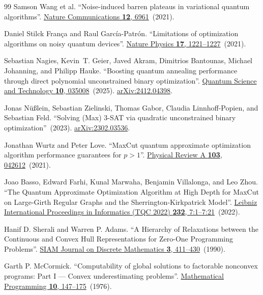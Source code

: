 \documentclass[a4paper,onecolumn,11pt,unpublished]{quantumarticle}
\theoremstyle{remark}
\begin{document}
\begin{thebibliography}{99}
Samson Wang et al.
\newblock ``Noise-induced barren plateaus in variational quantum algorithms''.
\newblock \href{https://doi.org/10.1038/s41467-021-27045-6}{Nature Communications {\bf 12}, 6961}~(2021).


Daniel Stilck França and Raul García-Patrón.
\newblock ``Limitations of optimization algorithms on noisy quantum devices''.
\newblock \href{https://doi.org/10.1038/s41567-021-01356-3}{Nature Physics {\bf 17}, 1221--1227}~(2021).


Sebastian Nagies, Kevin~T. Geier, Javed Akram, Dimitrios Bantounas, Michael Johanning, and Philipp Hauke.
\newblock ``Boosting quantum annealing performance through direct polynomial unconstrained binary optimization''.
\newblock \href{https://dx.doi.org/10.1088/2058-9565/adcae6}{Quantum Science and Technology {\bf 10}, 035008}~(2025).
\newblock \href{http://arxiv.org/abs/2412.04398}{arXiv:2412.04398}.

Jonas N{\"u}{\ss}lein, Sebastian Zielinski, Thomas Gabor, Claudia Linnhoff-Popien, and Sebastian Feld.
\newblock ``Solving (Max) 3-SAT via quadratic unconstrained binary optimization''~(2023).
\newblock \href{http://arxiv.org/abs/2302.03536}{arXiv:2302.03536}.

Jonathan Wurtz and Peter Love.
\newblock ``MaxCut quantum approximate optimization algorithm performance guarantees for $p>1$''.
\newblock \href{https://doi.org/10.1103/physreva.103.042612}{Physical Review A {\bf 103}, 042612}~(2021).


Joao Basso, Edward Farhi, Kunal Marwaha, Benjamin Villalonga, and Leo Zhou.
\newblock ``The Quantum Approximate Optimization Algorithm at High Depth for MaxCut on Large-Girth Regular Graphs and the Sherrington-Kirkpatrick Model''.
\newblock \href{https://doi.org/10.4230/lipics.tqc.2022.7}{Leibniz International Proceedings in Informatics (TQC 2022) {\bf 232}, 7:1--7:21}~(2022).


Hanif D. Sherali and Warren P. Adams.
\newblock ``A Hierarchy of Relaxations between the Continuous and Convex Hull Representations for Zero-One Programming Problems''.
\newblock \href{https://doi.org/10.1137/0403036}{SIAM Journal on Discrete Mathematics {\bf 3}, 411--430}~(1990).


Garth P. McCormick.
\newblock ``Computability of global solutions to factorable nonconvex programs: Part I --- Convex underestimating problems''.
\newblock \href{https://doi.org/10.1007/bf01580665}{Mathematical Programming {\bf 10}, 147--175}~(1976).

\end{thebibliography}
\endgroup
\end{document}
